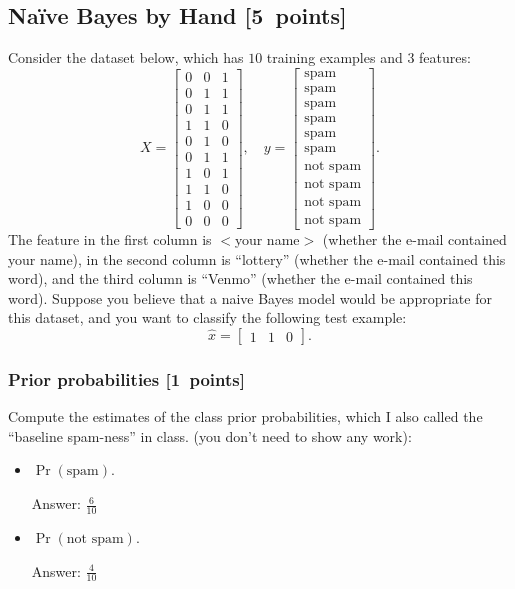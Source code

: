 \documentclass{article}
\newcommand{\blu}[1]{{\textcolor{blu}{#1}}}
\newenvironment{answer}{\par\begingroup\color{gre}Answer: }{\endgroup}
\let\ask\blu
\newcommand\pts[1]{\textcolor{pointscolour}{[#1~points]}}
\begin{document}
    \subsection{Na\"ive Bayes by Hand \pts{5}}

    Consider the dataset below, which has $10$ training examples and $3$ features:
    \[
    X = \begin{bmatrix}
        0 & 0 & 1\\
        0 & 1 & 1\\
        0 & 1 & 1\\
        1 & 1 & 0\\
        0 & 1 & 0\\
        0 & 1 & 1\\
        1 & 0 & 1\\
        1 & 1 & 0\\
        1 & 0 & 0\\
        0 & 0 & 0
    \end{bmatrix},
    \quad y = \begin{bmatrix}
        \text{spam}\\
        \text{spam}\\
        \text{spam}\\
        \text{spam}\\
        \text{spam}\\
        \text{spam}\\
        \text{not spam}\\
        \text{not spam}\\
        \text{not spam}\\
        \text{not spam}
    \end{bmatrix}.
    \]
    The feature in the first column is $<$your name$>$ (whether the e-mail contained your name), in the second column is ``lottery'' (whether the e-mail contained this word), and the third column is ``Venmo'' (whether the e-mail contained this word).
    Suppose you believe that a naive Bayes model would be appropriate for this dataset, and you want to classify the following test example:
    \[
    \hat{x} = \begin{bmatrix}1 & 1 & 0\end{bmatrix}.
    \]

    \subsubsection{Prior probabilities \pts{1}}
    \ask{Compute the estimates of the class prior probabilities, which I also called the ``baseline spam-ness'' in class.} (you don't need to show any work):
    \begin{itemize}
        \item $\Pr(\text{spam})$.
        \begin{answer}
        $\frac{6}{10}$
        \end{answer}
        \item $\Pr(\text{not spam})$.
        \begin{answer}
        $\frac{4}{10}$
        \end{answer}
    \end{itemize}
\end{document}
